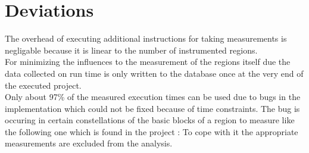 \section{Deviations}
The overhead of executing additional instructions for taking measurements is negligable because it is linear to the number of instrumented regions. \\
For minimizing the influences to the measurement of the regions itself due the data collected on run time is only written to the database once at the very end of the executed project.\\
Only about 97\% of the measured execution times can be used due to bugs in the implementation which could not be fixed because of time constraints.
The bug is occuring in certain constellations of the basic blocks of a region to measure like the following one which is found in the project :
To cope with it the appropriate measurements are excluded from the analysis.
